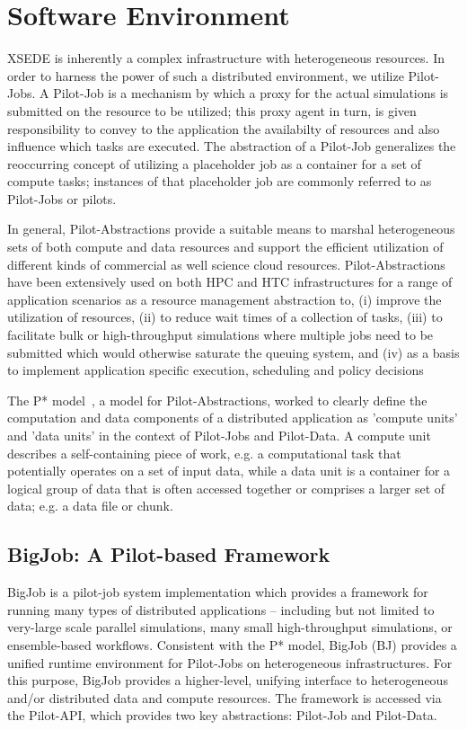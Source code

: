 \documentclass{sig-alternate}
\begin{document}
\section{Software Environment}

XSEDE is inherently a complex infrastructure with heterogeneous
resources. In order to harness the power of such a distributed
environment, we utilize Pilot-Jobs. A Pilot-Job is a mechanism by 
which a proxy for the actual simulations
is submitted on the resource to be utilized; this proxy agent in turn,
is given responsibility to convey to the application the availabilty
of resources and also influence which tasks are executed. The
abstraction of a Pilot-Job generalizes the reoccurring concept of
utilizing a placeholder job as a container for a set of compute tasks;
instances of that placeholder job are commonly referred to as
Pilot-Jobs or pilots. 

In general, Pilot-Abstractions provide a suitable means to marshal
heterogeneous sets of both compute and data resources and support the
efficient utilization of different kinds of commercial as well science
cloud resources. Pilot-Abstractions have been extensively used on both
HPC and HTC infrastructures for a range of application scenarios as a
resource management abstraction to, (i) improve the utilization of
resources, (ii) to reduce wait times of a collection of tasks, (iii)
to facilitate bulk or high-throughput simulations where multiple jobs
need to be submitted which would otherwise saturate the queuing
system, and (iv) as a basis to implement application specific
execution, scheduling and policy decisions

The P* model~\cite{pstar12}, a model for Pilot-Abstractions, worked to
clearly define the computation and data components of a distributed
application as 'compute units' and 'data units' in the context of
Pilot-Jobs and Pilot-Data. A compute unit describes a self-containing
piece of work, e.g. a computational task that potentially operates on
a set of input data, while a data unit is a container for a logical
group of data that is often accessed together or comprises a larger
set of data; e.g. a data file or chunk.


\subsection{BigJob: A Pilot-based Framework}

BigJob is a pilot-job system implementation which provides a framework
for running many types of distributed applications -- including but
not limited to very-large scale parallel simulations, many small
high-throughput simulations, or ensemble-based workflows. Consistent
with the P* model, BigJob (BJ) provides a unified runtime
environment for Pilot-Jobs on heterogeneous
infrastructures. For this purpose, BigJob provides a higher-level,
unifying interface to heterogeneous and/or distributed data and
compute resources. The framework is accessed via the Pilot-API, which
provides two key abstractions: Pilot-Job and Pilot-Data.
\end{document}
